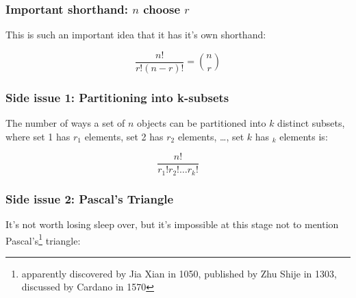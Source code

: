 \documentclass[12pt]{extbook}
\begin{document}
\subsubsection{Important shorthand: $n$ choose $r$}

This is such an important idea that it has it's own shorthand:

\begin{displaymath}
\frac{n!}{r!(n-r)!} = \binom{n}{r}
\end{displaymath}

 



\subsubsection{Side issue 1: Partitioning into k-subsets}

The number of ways a set of $n$ objects can be partitioned into $k$ distinct subsets, where set 1 has $r_1$ elements, set 2 has $r_2$ elements, \ldots, set $k$ has $_k$ elements is:

\begin{equation}
\frac{n!}{r_1!r_2! \ldots r_k!}
\end{equation}








 
\subsubsection{Side issue 2: Pascal's Triangle}

It's not worth losing sleep over, but it's impossible at this stage not to mention Pascal's\footnote{apparently discovered by Jia Xian in 1050, published by Zhu Shije in 1303, discussed by Cardano in 1570} triangle:
\end{document}
